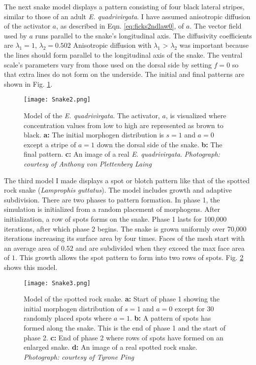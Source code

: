The next snake model displays a pattern consisting of four black lateral stripes, similar to those of an adult \textit{E. quadrivirgata}. I have assumed anisotropic diffusion of the activator $a$, as described in Eqn. \ref{eq:ficks2ndlaw0}, of $a$. The vector field used by $a$ runs parallel to the snake's longitudinal axis. The diffusivity coefficients are $\lambda_{1}=1$, $\lambda_{2}=0.502$ Anisotropic diffusion with $\lambda_{1}$ > $\lambda_{2}$ was important because the lines should form parallel to the longitudinal axis of the snake. The ventral scale's parameters vary from those used on the dorsal side by setting $f=0$ so that extra lines do not form on the underside. The initial and final patterns are shown in Fig. \ref{fig:Snake2}.

\begin{figure}[ht]
	\centering
	\texttt{[image: Snake2.png]}
	\caption{Model of the \textit{E. quadrivirgata}. The activator, $a$, is visualized where concentration values from low to high are represented as brown to black. \textbf{a:} The initial morphogen distribution is $s=1$ and $a=0$ except a stripe of $a=1$ down the dorsal side of the snake. \textbf{b:} The final pattern. \textbf{c:} An image of a real \textit{E. quadrivirgata}. \textit{Photograph: courtesy of Anthony von Plettenberg Laing}}
	\label{fig:Snake2}
\end{figure}

\newpage
The third model I made displays a spot or blotch pattern like that of the spotted rock snake (\textit{Lamprophis guttatus}). %
The model includes growth and adaptive subdivision. There are two phases to pattern formation. In phase 1, the simulation is initialized from a random placement of morphogens. After initialization, a row of spots forms on the snake. Phase 1 lasts for 100,000 iterations, after which phase 2 begins. The snake is grown uniformly over 70,000 iterations increasing its surface area by four times. Faces of the mesh start with an average area of $0.52$ and are subdivided when they exceed the max face area of $1$. This growth allows the spot pattern to form into two rows of spots. Fig. \ref{fig:Snake3} shows this model.

\begin{figure}[ht]
	\centering
	\texttt{[image: Snake3.png]}
	\caption{Model of the spotted rock snake. \textbf{a:} Start of phase 1 showing the initial morphogen distribution of $s=1$ and $a=0$ except for 30 randomly placed spots where $a=1$. \textbf{b:} A pattern of spots has formed along the snake. This is the end of phase 1 and the start of phase 2. \textbf{c:} End of phase 2 where rows of spots have formed on an enlarged snake. \textbf{d:} An image of a real spotted rock snake. \textit{Photograph: courtesy of Tyrone Ping}}
	\label{fig:Snake3}
\end{figure}

